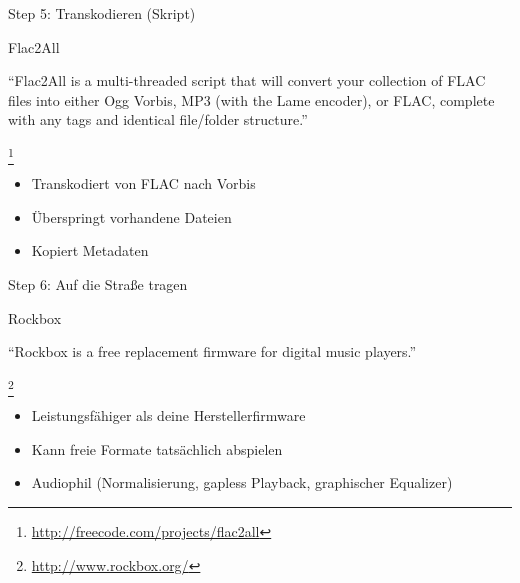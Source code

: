 \documentclass[aspectratio=1610]{beamer}
\newcommand{\src}[1]{
  \raggedright{
    \footnote{
      \small{\url{#1}}
    }
  }
}
\newcommand{\concept}[2]{
  \begin{block}{#1}
    \pause
    #2
  \end{block}
}
\begin{document}
  \begin{frame}{Step 5: Transkodieren (Skript)}
    \concept{Flac2All}{
      “Flac2All is a multi-threaded script that will convert your collection of
      FLAC files into either Ogg Vorbis, MP3 (with the Lame encoder), or FLAC,
      complete with any tags and identical file/folder
      structure.”\src{http://freecode.com/projects/flac2all}
    }
    \begin{itemize}
      \pause
      \item Transkodiert von FLAC nach Vorbis
      \pause
      \item Überspringt vorhandene Dateien
      \pause
      \item Kopiert Metadaten
    \end{itemize}
  \end{frame}

  \begin{frame}{Step 6: Auf die Straße tragen}
    \concept{Rockbox}{
      “Rockbox is a free replacement firmware for digital music
      players.”\src{http://www.rockbox.org/}
    }
    \begin{itemize}
      \pause
      \item Leistungsfähiger als deine Herstellerfirmware
      \pause
      \item Kann freie Formate tatsächlich abspielen
      \pause
      \item Audiophil (Normalisierung, gapless Playback, graphischer Equalizer)
    \end{itemize}
  \end{frame}
\end{document}
